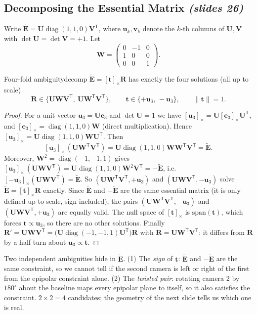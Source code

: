 \documentclass[11pt,a4paper]{article}
\newcommand{\slr}[1]{\texorpdfstring{\emph{(slides #1)}}{(slides #1)}}
\newcommand{\E}{\tilde{\bm E}}
\newcommand{\sk}[1]{[#1]_{\times}}
\newcommand{\norm}[1]{\lVert #1\rVert}
\newcommand{\tr}{^{\mathsf T}}
\DeclareMathOperator{\diag}{diag}
\begin{document}
\subsection{Decomposing the Essential Matrix \slr{26}}
Write $\E=\bm U\diag(1,1,0)\bm V\tr$, where $\bm u_k,\bm v_k$ denote the $k$-th columns of $\bm U,\bm V$ with $\det\bm U=\det\bm V=+1$. Let
\[
\bm W=\begin{pmatrix}0&-1&0\\1&0&0\\0&0&1\end{pmatrix}.
\]

\begin{theorem}{Four-fold ambiguity}{decomp}
$\E=\sk{\bm t}\bm R$ has exactly the four solutions (all up to scale)
\[
\bm R\in\{\bm U\bm W\bm V\tr,\ \bm U\bm W\tr\bm V\tr\},\qquad \bm t\in\{+\bm u_3,\,-\bm u_3\},\qquad\norm{\bm t}=1 .
\]
\end{theorem}
\begin{proof}
For a unit vector $\bm u_3=\bm U\bm e_3$ and $\det\bm U=1$ we have $\sk{\bm u_3}=\bm U\sk{\bm e_3}\bm U\tr$, and $\sk{\bm e_3}=\diag(1,1,0)\bm W$ (direct multiplication). Hence
$\sk{\bm u_3}=\bm U\diag(1,1,0)\bm W\bm U\tr$. Then
\[
\sk{\bm u_3}\,(\bm U\bm W\tr\bm V\tr)=\bm U\diag(1,1,0)\bm W\bm W\tr\bm V\tr=\E .
\]
Moreover, $\bm W^2=\diag(-1,-1,1)$ gives $\sk{\bm u_3}\,(\bm U\bm W\bm V\tr)=\bm U\diag(1,1,0)\bm W^2\bm V\tr=-\E$, i.e.\ $\sk{-\bm u_3}(\bm U\bm W\bm V\tr)=\E$.
So $(\bm U\bm W\tr\bm V\tr,+\bm u_3)$ and $(\bm U\bm W\bm V\tr,-\bm u_3)$ solve $\E=\sk{\bm t}\bm R$ exactly. Since $\E$ and $-\E$ are the same essential matrix (it is only defined up to scale, sign included), the pairs
$(\bm U\bm W\tr\bm V\tr,-\bm u_3)$ and $(\bm U\bm W\bm V\tr,+\bm u_3)$ are equally valid. The null space of $\sk{\bm t}$ is $\mathrm{span}(\bm t)$, which forces $\bm t\propto\bm u_3$, so there are no other solutions.
Finally $\bm R'=\bm U\bm W\bm V\tr=\bigl(\bm U\diag(-1,-1,1)\bm U\tr\bigr)\bm R$ with $\bm R=\bm U\bm W\tr\bm V\tr$: it differs from $\bm R$ by a half turn about $\bm u_3\propto\bm t$.
\end{proof}

\begin{intuition}
Two independent ambiguities hide in $\E$. (1) The \emph{sign} of $\bm t$: $\E$ and $-\E$ are the same constraint, so we cannot tell if the second camera is left or right of the first from the epipolar constraint alone.
(2) The \emph{twisted pair}: rotating camera 2 by $180^\circ$ about the baseline maps every epipolar plane to itself, so it also satisfies the constraint. $2\times2=4$ candidates; the geometry of the next slide tells us which one is real.
\end{intuition}
\end{document}
